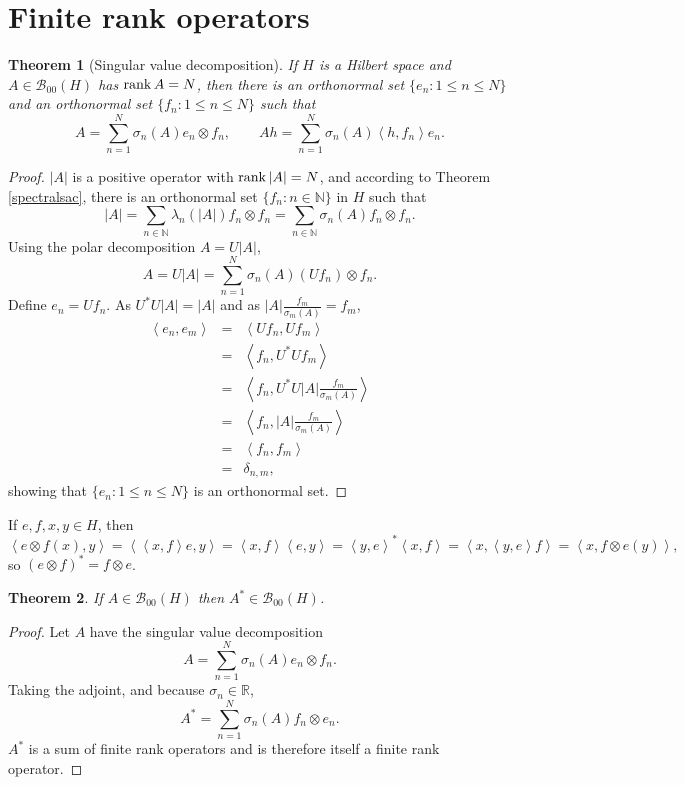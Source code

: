 \documentclass{article}
\newcommand{\inner}[2]{\left\langle #1, #2 \right\rangle}
\newcommand{\rank}{\ensuremath\mathrm{rank\,}}
\newtheorem{theorem}{Theorem}
\theoremstyle{definition}
\begin{document}
\section{Finite rank operators}
\begin{theorem}[Singular value decomposition]
If $H$ is a Hilbert space and $A \in \mathscr{B}_{00}(H)$ has $\rank A=N$, then there is an orthonormal set $\{e_n:1 \leq n \leq N\}$ and an orthonormal set 
$\{f_n:1 \leq n \leq N\}$ such that
\[
A = \sum_{n=1}^N \sigma_n(A) e_n \otimes f_n, \qquad Ah=\sum_{n=1}^N \sigma_n(A) \inner{h}{f_n}e_n.
\]
\label{finiterankSVD}
\end{theorem}
\begin{proof}
$|A|$ is a positive operator with $\rank |A|=N$, and according to Theorem \ref{spectralsac}, there is an orthonormal set $\{f_n: n \in \mathbb{N}\}$ in $H$
such that 
\[
|A| = \sum_{n \in \mathbb{N}} \lambda_n(|A|) f_n \otimes f_n= \sum_{n \in \mathbb{N}} \sigma_n(A) f_n \otimes f_n.
\]
Using the polar decomposition
$A=U|A|$,
\[
A = U|A| = \sum_{n=1}^N \sigma_n(A) (Uf_n) \otimes f_n.
\]
Define $e_n=Uf_n$. As $U^*U|A|=|A|$ and as $|A| \frac{f_m}{\sigma_m(A)}=f_m$,
\begin{eqnarray*}
\inner{e_n}{e_m}&=&\inner{Uf_n}{Uf_m}\\
&=&\inner{f_n}{U^*Uf_m}\\
&=&\inner{f_n}{U^*U |A| \frac{f_m}{\sigma_m(A)}}\\
&=&\inner{f_n}{|A| \frac{f_m}{\sigma_m(A)}}\\
&=&\inner{f_n}{f_m}\\
&=&\delta_{n,m},
\end{eqnarray*}
showing that $\{e_n:1 \leq n \leq N\}$ is an orthonormal set.
\end{proof}

If $e,f,x,y \in H$, then
\[
\inner{e \otimes f (x)}{y}
=\inner{\inner{x}{f}e}{y}
=\inner{x}{f}\inner{e}{y}
=\inner{y}{e}^* \inner{x}{f}
=\inner{x}{\inner{y}{e}f}
=\inner{x}{f \otimes e (y)},
\]
so $(e \otimes f)^*=f \otimes e$.

\begin{theorem}
If $A \in \mathscr{B}_{00}(H)$ then
$A^* \in \mathscr{B}_{00}(H)$.
\end{theorem}
\begin{proof}
Let $A$ have the singular value decomposition
\[
A=\sum_{n=1}^N \sigma_n(A) e_n \otimes f_n.
\]
Taking the adjoint, and because $\sigma_n \in \mathbb{R}$,
\[
A^* = \sum_{n=1}^N \sigma_n(A) f_n \otimes e_n.
\]
 $A^*$ is a sum of finite rank operators and is therefore itself a finite rank operator.
\end{proof}
\end{document}
